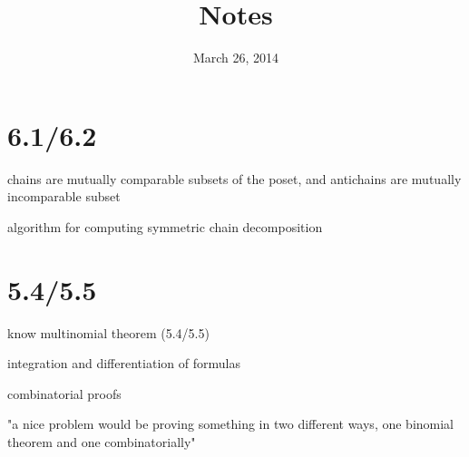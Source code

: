 \documentclass{article}
\begin{document}
\title{Notes}
\date{March 26, 2014}
\maketitle
\section*{6.1/6.2}
chains are mutually comparable subsets of the poset, and antichains are mutually incomparable subset

algorithm for computing symmetric chain decomposition

\section*{5.4/5.5}
know multinomial theorem (5.4/5.5)

integration and differentiation of formulas

combinatorial proofs

"a nice problem would be proving something in two different ways, one binomial theorem and one combinatorially"
\end{document}
